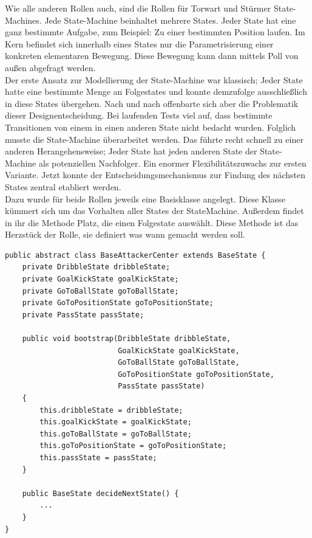 \documentclass[fontsize=12pt,a4paper,final]{scrartcl}[2003/01/01]
\begin{document}
Wie alle anderen Rollen auch, sind die Rollen für Torwart und Stürmer State-Machines. Jede State-Machine beinhaltet mehrere States. Jeder State hat eine ganz bestimmte Aufgabe, zum Beispiel: Zu einer bestimmten Position laufen. Im Kern befindet sich innerhalb eines States nur die Parametrisierung einer konkreten elementaren Bewegung. Diese Bewegung kann dann mittels Poll von außen abgefragt werden.
\\

Der erste Ansatz zur Modellierung der State-Machine war klassisch; Jeder State hatte eine bestimmte Menge an Folgestates und konnte demzufolge ausschließlich in diese States übergehen. Nach und nach offenbarte sich aber die Problematik dieser Designentscheidung. Bei laufenden Tests viel auf, dass bestimmte Transitionen von einem in einen anderen State nicht bedacht wurden. Folglich musste die State-Machine überarbeitet werden. Das führte recht schnell zu einer anderen Herangehensweise; Jeder State hat jeden anderen State der State-Machine als potenziellen Nachfolger. Ein enormer Flexibilitätszuwachs zur ersten Variante. Jetzt konnte der Entscheidungsmechanismus zur Findung des nächsten States  zentral etabliert werden. 
\\

Dazu wurde für beide Rollen jeweils eine Basisklasse angelegt. Diese Klasse kümmert sich um das Vorhalten aller States der StateMachine. Außerdem findet in ihr die Methode Platz, die einen Folgestate auswählt. Diese Methode ist das Herzstück der Rolle, sie definiert was wann gemacht werden soll.
\\

\begin{lstlisting}[caption=Beispiel Basisklasse Stürmer, captionpos=b, label=Beispiel Basisklasse Stürmer]
public abstract class BaseAttackerCenter extends BaseState {
    private DribbleState dribbleState;
    private GoalKickState goalKickState;
    private GoToBallState goToBallState;
    private GoToPositionState goToPositionState;
    private PassState passState;

    public void bootstrap(DribbleState dribbleState, 
    					  GoalKickState goalKickState, 
    					  GoToBallState goToBallState, 
                          GoToPositionState goToPositionState, 
                          PassState passState) 
    {
        this.dribbleState = dribbleState;
        this.goalKickState = goalKickState;
        this.goToBallState = goToBallState;
        this.goToPositionState = goToPositionState;
        this.passState = passState;
    }

    public BaseState decideNextState() {
        ...
    }
}
\end{lstlisting}
\end{document}
